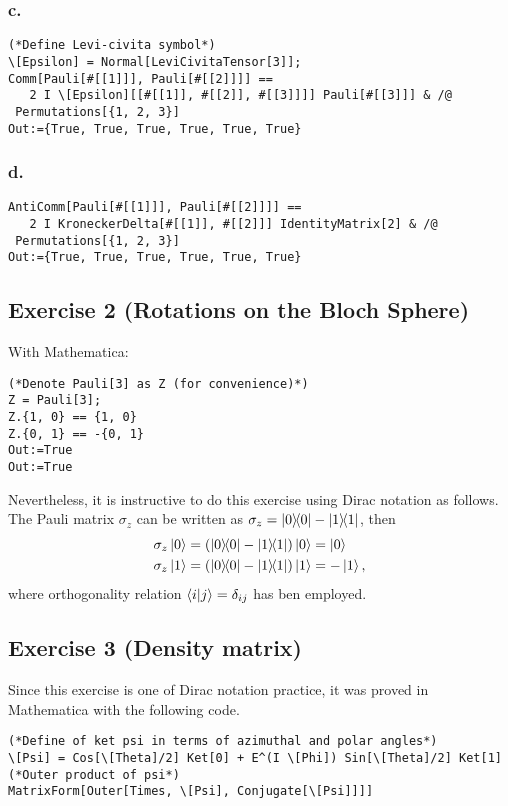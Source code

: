 \subsubsection{c.}
\begin{verbatim}
(*Define Levi-civita symbol*)
\[Epsilon] = Normal[LeviCivitaTensor[3]];
Comm[Pauli[#[[1]]], Pauli[#[[2]]]] == 
   2 I \[Epsilon][[#[[1]], #[[2]], #[[3]]]] Pauli[#[[3]]] & /@ 
 Permutations[{1, 2, 3}]
Out:={True, True, True, True, True, True}
\end{verbatim}

\subsubsection{d.}
\begin{verbatim}
AntiComm[Pauli[#[[1]]], Pauli[#[[2]]]] == 
   2 I KroneckerDelta[#[[1]], #[[2]]] IdentityMatrix[2] & /@ 
 Permutations[{1, 2, 3}]
Out:={True, True, True, True, True, True}
\end{verbatim}

\subsection{Exercise 2 (Rotations on the Bloch Sphere)}\noindent
With Mathematica:
\begin{verbatim}
(*Denote Pauli[3] as Z (for convenience)*)
Z = Pauli[3];
Z.{1, 0} == {1, 0}
Z.{0, 1} == -{0, 1}
Out:=True
Out:=True
\end{verbatim}
Nevertheless, it is instructive to do this exercise using Dirac notation as follows. The Pauli matrix
$\sigma_z$ can be written as $\sigma_z=\dyad{0}{0}-\dyad{1}{1}$, then
\begin{align}
\sigma_z \ket{0}&=\qty(\dyad{0}{0}-\dyad{1}{1})\ket{0}=\ket{0}\\
\sigma_z \ket{1}&=\qty(\dyad{0}{0}-\dyad{1}{1})\ket{1}=-\ket{1},
\end{align}
where orthogonality relation $\braket{i}{j}=\delta_{ij}$ has ben employed.

\subsection{Exercise 3 (Density matrix)}\noindent
Since this exercise is one of Dirac notation practice, it was proved 
in Mathematica with the following code.
\begin{verbatim}
(*Define of ket psi in terms of azimuthal and polar angles*)
\[Psi] = Cos[\[Theta]/2] Ket[0] + E^(I \[Phi]) Sin[\[Theta]/2] Ket[1]
(*Outer product of psi*)
MatrixForm[Outer[Times, \[Psi], Conjugate[\[Psi]]]]
\end{verbatim}

